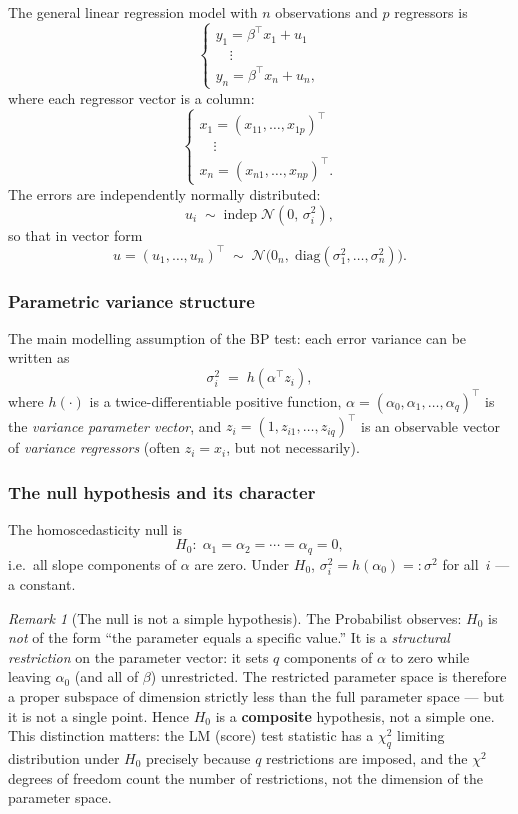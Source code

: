 \documentclass[a4paper,oneside,12pt]{extarticle}
\theoremstyle{plain}
\theoremstyle{definition}
\theoremstyle{remark}
\newtheorem{remark}[proposition]{Remark}
\begin{document}
The general linear regression model with $n$ observations and $p$
regressors is
\[
  \begin{cases}
    y_1 = \beta^\top x_1 + u_1 \\
    \quad\vdots \\
    y_n = \beta^\top x_n + u_n,
  \end{cases}
\]
where each regressor vector is a column:
\[
  \begin{cases}
    x_1 = (x_{11},\ldots,x_{1p})^\top \\
    \quad\vdots \\
    x_n = (x_{n1},\ldots,x_{np})^\top.
  \end{cases}
\]
The errors are independently normally distributed:
\[
  u_i \;\sim\; \mathrm{indep}\; \mathcal{N}(0,\,\sigma_i^2),
\]
so that in vector form
\[
  u = (u_1,\ldots,u_n)^\top
  \;\sim\;
  \mathcal{N}\!\bigl(0_n,\;\mathrm{diag}(\sigma_1^2,\ldots,\sigma_n^2)\bigr).
\]

\subsubsection*{Parametric variance structure}

The main modelling assumption of the BP test: each error variance
can be written as
\[
  \sigma_i^2 \;=\; h(\alpha^\top z_i),
\]
where $h(\cdot)$ is a twice-differentiable positive function,
$\alpha = (\alpha_0, \alpha_1, \ldots, \alpha_q)^\top$ is the
\emph{variance parameter vector}, and $z_i = (1, z_{i1}, \ldots,
z_{iq})^\top$ is an observable vector of \emph{variance regressors}
(often $z_i = x_i$, but not necessarily).

\subsubsection*{The null hypothesis and its character}

The homoscedasticity null is
\[
  H_0:\;\alpha_1 = \alpha_2 = \cdots = \alpha_q = 0,
\]
i.e.\ all slope components of $\alpha$ are zero.  Under $H_0$,
$\sigma_i^2 = h(\alpha_0) =: \sigma^2$ for all~$i$ — a constant.

\begin{remark}[The null is not a simple hypothesis]
The Probabilist observes: $H_0$ is \emph{not} of the form ``the parameter equals
a specific value.''  It is a \emph{structural restriction} on the
parameter vector: it sets $q$ components of $\alpha$ to zero while
leaving $\alpha_0$ (and all of $\beta$) unrestricted.  The restricted
parameter space is therefore a proper subspace of dimension strictly
less than the full parameter space — but it is not a single point.
Hence $H_0$ is a \textbf{composite} hypothesis, not a simple one.
This distinction matters: the LM (score) test statistic has a
$\chi^2_q$ limiting distribution under $H_0$ precisely because $q$
restrictions are imposed, and the $\chi^2$ degrees of freedom count
the number of restrictions, not the dimension of the parameter space.
\end{remark}
\end{document}
